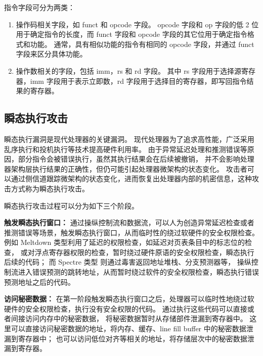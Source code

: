 指令字段可分为两类：
\begin{enumerate}
    \item 操作码相关字段，如 funct 和 opcode 字段。
opcode 字段和 op 字段的低 2 位用于确定指令的长度，而 funct 字段和 opcode 字段的其它位用于确定指令格式和功能。
通常，具有相似功能的指令有相同的 opcode 字段，并通过 funct 字段来区分具体功能。\par
    \item 操作数相关的字段，包括 imm，rs 和 rd 字段。
其中 rs 字段用于选择源寄存器，imm 字段用于表示立即数，rd 字段用于选择目的寄存器，即写回指令结果的寄存器。\par
\end{enumerate}

\subsection{瞬态执行攻击}
瞬态执行漏洞是现代处理器的关键漏洞。
现代处理器为了追求高性能，广泛采用乱序执行和投机执行等技术提高硬件利用率。
由于异常延迟处理和推测错误等原因，部分指令会被错误执行，虽然其执行结果会在后续被撤销，
并不会影响处理器架构层执行结果的正确性，但仍可能引起处理器微架构的状态变化。
攻击者可以通过侧信道跟踪微架构的状态变化，进而恢复出处理器内部的机密信息，这种攻击方式称为瞬态执行攻击。\par

瞬态执行攻击过程可以分为如下三个阶段。\par

\textbf{触发瞬态执行窗口：}
通过操纵控制流和数据流，可以人为创造异常延迟检查或者推测错误等场景，触发瞬态执行窗口，从而临时性的绕过软硬件的安全权限检查。
例如 Meltdown 类型利用了延迟的权限检查，如延迟对页表条目中的标志位的检查\cite{horn2018meltdown}，
或对浮点寄存器权限的检查\cite{stecklina1806lazyfp}，暂时绕过硬件原语的安全权限检查，瞬态执行后续的代码；
而 Spectre 类型\cite{kocher2020spectre} 则通过毒害返回地址堆栈\cite{maisuradze2018ret2spec}、分支预测器等，
操纵控制流进入错误预测的跳转地址，从而暂时绕过软件的安全权限检查，瞬态执行错误预测地址之后的代码。\par

\textbf{访问秘密数据：}
在第一阶段触发瞬态执行窗口之后，处理器可以临时性地绕过软硬件的安全权限检查，执行没有安全权限的代码。
通过执行这些代码可以直接或者间接访问内存中的秘密数据，
将秘密数据暂时从存储部件泄漏到寄存器中\cite{van2019ridl}\cite{van2021cacheout}。
这里可以直接访问秘密数据的地址，将内存、缓存、line fill buffer 中的秘密数据泄漏到寄存器中；
也可以访问低位对齐等相关的地址，将存储层次中的秘密数据泄漏到寄存器。

